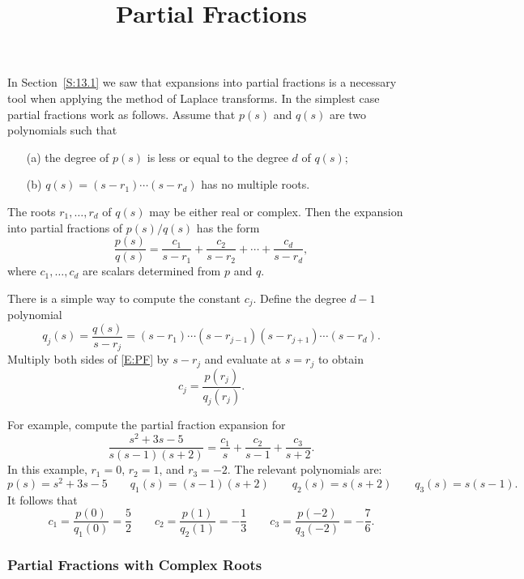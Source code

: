 \documentclass{ximera}
\title{Partial Fractions}
\begin{document}
\begin{abstract}
\end{abstract}
\maketitle

  \label{S:PF}

In Section~\ref{S:13.1} we saw that expansions into partial fractions is a 
necessary tool when applying the method of Laplace transforms.  In the
simplest case partial fractions work as follows.  Assume that $p(s)$ and 
$q(s)$ are two polynomials such that
\begin{enumerate}
\item[(a)] the degree of $p(s)$ is less or equal to the degree $d$ of $q(s)$;
\item[(b)] $q(s)=(s-r_1)\cdots(s-r_d)$ has no multiple roots.
\end{enumerate}
The roots $r_1,\ldots,r_d$ of $q(s)$ may be either real or complex.  Then the 
expansion into partial fractions of $p(s)/q(s)$ has the form
\begin{equation}  \label{E:PF}
\frac{p(s)}{q(s)} = \frac{c_1}{s-r_1}+\frac{c_2}{s-r_2}+\cdots
+\frac{c_d}{s-r_d},
\end{equation}
where $c_1,\ldots,c_d$ are  scalars determined from $p$ and $q$.

There is a simple way to compute the constant $c_j$. Define the degree $d-1$
polynomial
\[
q_j(s) = \frac{q(s)}{s-r_j} = 
(s-r_1)\cdots(s-r_{j-1})(s-r_{j+1})\cdots(s-r_d).
\]
Multiply both sides of \eqref{E:PF} by $s-r_j$ and evaluate at $s=r_j$ to 
obtain
\[
c_j = \frac{p(r_j)}{q_j(r_j)}.
\]   

For example, compute the partial fraction expansion for
\[
\frac{s^2+3s-5}{s(s-1)(s+2)} = \frac{c_1}{s}+\frac{c_2}{s-1}+\frac{c_3}{s+2}.
\]
In this example, $r_1=0$, $r_2=1$, and $r_3=-2$.  The relevant polynomials
are:
\[
p(s) = s^2+3s-5 \qquad q_1(s) = (s-1)(s+2) \qquad q_2(s) = s(s+2) \qquad
q_3(s) = s(s-1).
\]
It follows that 
\[
c_1 = \frac{p(0)}{q_1(0)} = \frac{5}{2} \qquad
c_2 = \frac{p(1)}{q_2(1)} = -\frac{1}{3} \qquad
c_3 = \frac{p(-2)}{q_3(-2)} = -\frac{7}{6}.
\]

\subsubsection*{Partial Fractions with Complex Roots}
\end{document}
